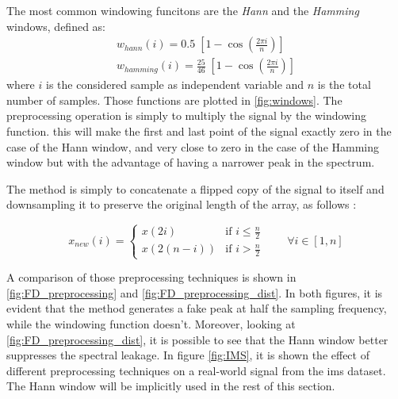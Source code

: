 The most common windowing funcitons are the \emph{Hann} and the \emph{Hamming} windows, defined as:
\begin{eqnarray}
    w_{hann}(i) = 0.5\; \left[1 - \cos \left ( \frac{2 \pi i}{n} \right) \right] \\
    w_{hamming}(i) = \frac{25}{46}\; \left[1 - \cos \left ( \frac{2 \pi i}{n} \right) \right]
\end{eqnarray}
where $i$ is the considered sample as independent variable and $n$ is the total number of samples. Those functions are plotted in \autoref{fig:windows}. The preprocessing operation is simply to multiply the signal by the windowing function. this will make the first and last point of the signal exactly zero in the case of the Hann window, and very close to zero in the case of the Hamming window but with the advantage of having a narrower peak in the spectrum. 

The  method is simply to concatenate a flipped copy of the signal to itself and downsampling it to preserve the original length of the array, as follows \cite{Preprocessing}:

\begin{equation}
    x_{new}(i) = \begin{cases}
        x(2i) & \text{if } i \leq \frac{n}{2} \\
        x(2(n-i)) & \text{if } i > \frac{n}{2}
    \end{cases} \qquad \forall i \in [1,n]
\end{equation}

A comparison of those preprocessing techniques is shown in \autoref{fig:FD_preprocessing} and \autoref{fig:FD_preprocessing_dist}. In both figures, it is evident that the  method generates a fake peak at half the sampling frequency, while the windowing function doesn't. Moreover, looking at \autoref{fig:FD_preprocessing_dist}, it is possible to see that the Hann window better suppresses the spectral leakage.
In figure \autoref{fig:IMS}, it is shown the effect of different preprocessing techniques on a real-world signal from the \gls{ims} dataset. The Hann window will be implicitly used in the rest of this section.



